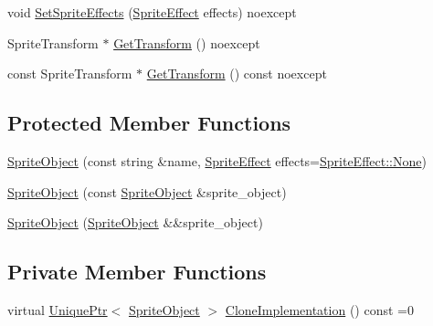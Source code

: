 \begin{DoxyCompactItemize}
\item 
void \hyperlink{classmage_1_1_sprite_object_aef6cf252d79c9fcec978d83642da0e9a}{Set\+Sprite\+Effects} (\hyperlink{namespacemage_a9cfe18123066ba4236f548f9de75d881}{Sprite\+Effect} effects) noexcept
\item 
Sprite\+Transform $\ast$ \hyperlink{classmage_1_1_sprite_object_a709751381e87803088fc7013043bc65e}{Get\+Transform} () noexcept
\item 
const Sprite\+Transform $\ast$ \hyperlink{classmage_1_1_sprite_object_ada7bf149994abd24c652b83e8f9374ec}{Get\+Transform} () const noexcept
\end{DoxyCompactItemize}
\subsection*{Protected Member Functions}
\begin{DoxyCompactItemize}
\item 
\hyperlink{classmage_1_1_sprite_object_af68fccf1e8a51f5b4a99a48dfb515f65}{Sprite\+Object} (const string \&name, \hyperlink{namespacemage_a9cfe18123066ba4236f548f9de75d881}{Sprite\+Effect} effects=\hyperlink{namespacemage_a9cfe18123066ba4236f548f9de75d881a6adf97f83acf6453d4a6a4b1070f3754}{Sprite\+Effect\+::\+None})
\item 
\hyperlink{classmage_1_1_sprite_object_ac75871029cd740aeb0dd3e23d037b703}{Sprite\+Object} (const \hyperlink{classmage_1_1_sprite_object}{Sprite\+Object} \&sprite\+\_\+object)
\item 
\hyperlink{classmage_1_1_sprite_object_a32243a50679f743554850069f27cca9b}{Sprite\+Object} (\hyperlink{classmage_1_1_sprite_object}{Sprite\+Object} \&\&sprite\+\_\+object)
\end{DoxyCompactItemize}
\subsection*{Private Member Functions}
\begin{DoxyCompactItemize}
\item 
virtual \hyperlink{namespacemage_a8c307fbcc33bce9b7f2aa4c26c3b95cf}{Unique\+Ptr}$<$ \hyperlink{classmage_1_1_sprite_object}{Sprite\+Object} $>$ \hyperlink{classmage_1_1_sprite_object_acbbe3d5894e5a43df411b7e5785ae174}{Clone\+Implementation} () const =0
\end{DoxyCompactItemize}
